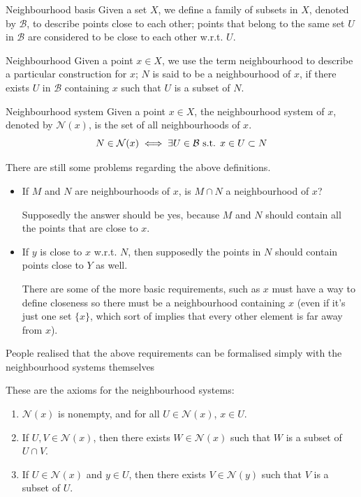 \begin{defn}{Neighbourhood basis}{}
Given a set $X$, we define a family of subsets in $X$, denoted by $\mathcal{B}$, to describe points close to each other; points that belong to the same set $U$ in $\mathcal{B}$ are considered to be close to each other w.r.t. $U$.
\end{defn}

\begin{defn}{Neighbourhood}{}
Given a point $x \in X$, we use the term neighbourhood to describe a particular construction for $x$; $N$ is said to be a neighbourhood of $x$, if there exists $U$ in $\mathcal{B}$ containing $x$ such that $U$ is a subset of $N$.
\end{defn}

\begin{defn}{Neighbourhood system}{}
Given a point $x \in X$, the neighbourhood system of $x$, denoted by $\mathcal{N}(x)$, is the set of all neighbourhoods of $x$.
\[ N\in\mathcal{N}(x) \iff \exists U\in\mathcal{B} \text{ s.t. } x\in U\subset N \]
\end{defn}

There are still some problems regarding the above definitions.
\begin{itemize}
\item If $M$ and $N$ are neighbourhoods of $x$, is $M\cap N$ a neighbourhood of $x$?

Supposedly the answer should be yes, because $M$ and $N$ should contain all the points that are close to $x$.

\item If $y$ is close to $x$ w.r.t. $N$, then supposedly the points in $N$ should contain points close to $Y$ as well.

There are some of the more basic requirements, such as $x$ must have a way to define closeness so there must be a neighbourhood containing $x$ (even if it's just one set $\{x\}$, which sort of implies that every other element is far away from $x$).
\end{itemize}

People realised that the above requirements can be formalised simply with the neighbourhood systems themselves 

These are the axioms for the neighbourhood systems:
\begin{enumerate}
\item $\mathcal{N}(x)$ is nonempty, and for all $U\in\mathcal{N}(x)$, $x\in U$.
\item If $U,V\in\mathcal{N}(x)$, then there exists $W\in\mathcal{N}(x)$ such that $W$ is a subset of $U\cap V$.
\item If $U\in\mathcal{N}(x)$ and $y\in U$, then there exists $V\in\mathcal{N}(y)$ such that $V$ is a subset of $U$.
\end{enumerate}

